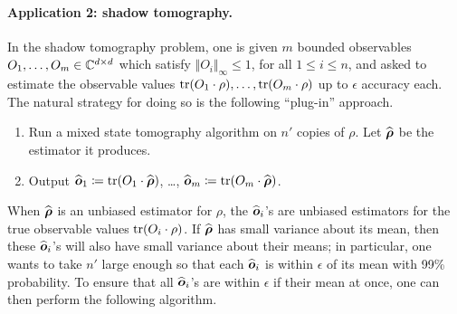 \documentclass{article}
\begin{document}
\paragraph{Application 2: shadow tomography.}
In the shadow tomography problem, one is given $m$ bounded observables $O_1, \ldots, O_m \in \mathbb C^{d \times d}$ which satisfy $\Vert O_i \Vert_{\infty} \leq 1$, for all $1 \leq i \leq n$, and asked to estimate the observable values $\tr(O_1 \cdot \rho), \ldots, \tr(O_m \cdot \rho)$ up to $\epsilon$ accuracy each.
The natural strategy for doing so is the following ``plug-in'' approach.
\begin{enumerate}
    \item Run a mixed state tomography algorithm on $n'$ copies of $\rho$.
    Let $\widehat{\boldsymbol{\rho}}$ be the estimator it produces.
    \item Output $\widehat{\boldsymbol{o}}_1 \coloneqq \tr(O_1 \cdot \widehat{\boldsymbol{\rho}})$, \ldots, $\widehat{\boldsymbol{o}}_m \coloneqq \tr(O_m \cdot \widehat{\boldsymbol{\rho}})$. 
\end{enumerate}
When $\widehat{\boldsymbol{\rho}}$ is an unbiased estimator for $\rho$,
the $\widehat{\boldsymbol{o}}_i$'s are unbiased estimators for the true observable values $\tr(O_i \cdot \rho)$.
If $\widehat{\boldsymbol{\rho}}$ has small variance about its mean,
then these $\widehat{\boldsymbol{o}}_i$'s will also have small variance about their means; in particular, one wants to take $n'$ large enough so that each $\widehat{\boldsymbol{o}}_i$ is within $\epsilon$ of its mean with 99\% probability.
To ensure that all  $\widehat{\boldsymbol{o}}_i$'s are within $\epsilon$ if their mean at once, one can then perform the following algorithm.
\end{document}
